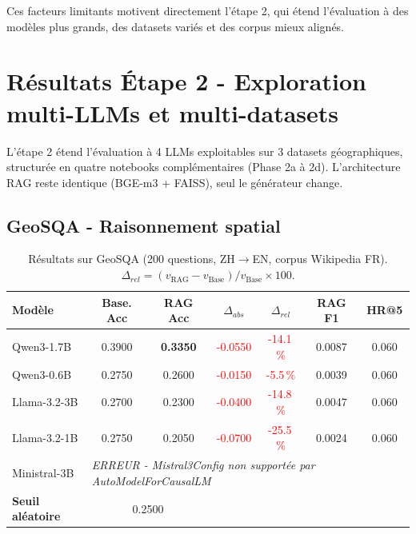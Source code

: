 \documentclass[12pt,a4paper]{article}
\begin{document}
Ces facteurs limitants motivent directement l'\'etape 2, qui \'etend l'\'evaluation \`a des mod\`eles plus grands, des datasets vari\'es et des corpus mieux align\'es.


\section{R\'esultats \'Etape 2 - Exploration multi-LLMs et multi-datasets}
\label{sec:phase2}

L'\'etape 2 \'etend l'\'evaluation \`a 4 LLMs exploitables sur 3 datasets g\'eographiques, structur\'ee en quatre notebooks compl\'ementaires (Phase 2a \`a 2d). L'architecture RAG reste identique (BGE-m3 + FAISS), seul le g\'en\'erateur change.

\subsection{GeoSQA - Raisonnement spatial}

\begin{table}[H]
\centering
\caption{R\'esultats sur GeoSQA (200 questions, ZH$\rightarrow$EN, corpus Wikipedia FR). $\Delta_{rel} = (v_{\text{RAG}} - v_{\text{Base}}) / v_{\text{Base}} \times 100$.}
\label{tab:geosqa_results}
\small
\begin{tabular}{@{} l c c c c c c @{}}
\toprule
\textbf{Mod\`ele} & \textbf{Base. Acc} & \textbf{RAG Acc}
  & \textbf{$\Delta_{abs}$} & \textbf{$\Delta_{rel}$}
  & \textbf{RAG F1} & \textbf{HR@5} \\
\midrule
Qwen3-1.7B
  & 0.3900 & \textbf{0.3350}
  & \textcolor{red}{-0.0550} & \textcolor{red}{-14.1\,\%}
  & 0.0087 & 0.060 \\
\rowcolor{lightgray}
Qwen3-0.6B
  & 0.2750 & 0.2600
  & \textcolor{red}{-0.0150} & \textcolor{red}{-5.5\,\%}
  & 0.0039 & 0.060 \\
Llama-3.2-3B
  & 0.2700 & 0.2300
  & \textcolor{red}{-0.0400} & \textcolor{red}{-14.8\,\%}
  & 0.0047 & 0.060 \\
\rowcolor{lightgray}
Llama-3.2-1B
  & 0.2750 & 0.2050
  & \textcolor{red}{-0.0700} & \textcolor{red}{-25.5\,\%}
  & 0.0024 & 0.060 \\
\midrule
Ministral-3B
  & \multicolumn{6}{l}{\textit{ERREUR - Mistral3Config non support\'ee par AutoModelForCausalLM}} \\
\midrule
\textbf{Seuil al\'eatoire} & \multicolumn{2}{c}{0.2500} & & & & \\
\bottomrule
\end{tabular}
\end{table}
\end{document}

